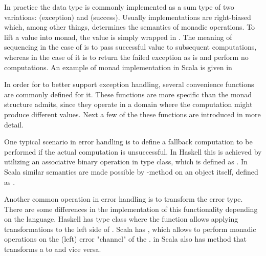 In practice the  data type is commonly implemented as a sum type of two variations:  (exception) and  (success). Usually implementations are right-biased which, among other things, determines the semantics of monadic operations. To lift a value into  monad, the value is simply wrapped in . The meaning of sequencing in the case of  is to pass successful value to subsequent computations, whereas in the case of  it is to return the failed exception as is and perform no computations. An example of  monad implementation in Scala is given in 



In order for  to better support exception handling, several convenience functions are commonly defined for it. These functions are more specific than the monad structure admits, since they operate in a domain where the computation might produce different values. Next a few of the these functions are introduced in more detail.

One typical scenario in error handling is to define a fallback computation to be performed if the actual computation is unsuccessful. In Haskell this is achieved by utilizing an associative binary operation in  type class, which is defined as . In Scala similar semantics are made possible by  -method on an  object itself, defined as . 

Another common operation in error handling is to transform the error type. There are some differences in the implementation of this functionality depending on the language. Haskell has  type class where the function  allows applying transformations to the left side of . Scala has , which allows to perform monadic operations on the (left) error "channel" of the .  in Scala also has  method that transforms a  to  and vice versa.

